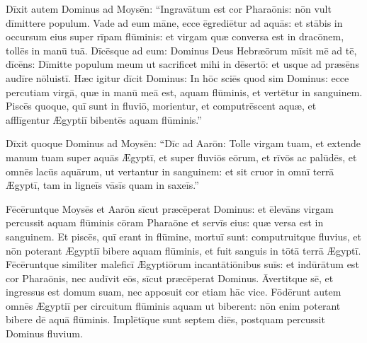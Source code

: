 Dīxit autem Dominus
ad Moysēn: ``Ingravātum est cor
Pharaōnis: nōn vult dīmittere populum. Vade ad eum
māne, ecce ēgrediētur ad aquās: et stābis in occursum eius super rīpam
flūminis: et virgam quæ conversa est in dracōnem, tollēs
in manū tuā. Dīcēsque ad eum: Dominus Deus Hebræōrum
mīsit mē ad tē, dīcēns: Dīmitte populum meum ut sacrificet
mihi in dēsertō: et usque ad præsēns audīre nōluistī. Hæc igitur dīcit
Dominus: In hōc sciēs quod sim Dominus: ecce percutiam virgā, quæ in manū
meā est, aquam flūminis, et vertētur in sanguinem.  Piscēs quoque, quī
sunt in fluviō, morientur, et computrēscent aquæ, et
afflīgentur Ægyptiī bibentēs aquam flūminis.''

Dīxit
quoque Dominus ad Moysēn: ``Dīc ad Aarōn: Tolle virgam
tuam, et extende manum tuam super aquās Ægyptī, et super fluviōs eōrum, et
rīvōs ac palūdēs, et omnēs lacūs aquārum, ut vertantur in
sanguinem: et sit cruor in omnī terrā Ægyptī, tam in ligneīs vāsīs quam in
saxeīs.''

Fēcēruntque Moysēs et Aarōn
sīcut præcēperat Dominus: et
ēlevāns virgam percussit aquam flūminis cōram
Pharaōne et servīs eius: quæ versa est in sanguinem.  Et
piscēs, quī erant in flūmine, mortuī sunt: computruitque
fluvius, et nōn poterant Ægyptiī bibere aquam flūminis, et fuit sanguis in
tōtā terrā Ægyptī.  Fēcēruntque similiter maleficī
Ægyptiōrum incantātiōnibus suīs: et indūrātum est cor Pharaōnis, nec audīvit eōs, sīcut
præcēperat Dominus.  Āvertitque sē, et
ingressus est domum suam, nec apposuit cor etiam hāc vice.
Fōdērunt autem omnēs Ægyptiī per circuitum flūminis
aquam ut biberent: nōn enim poterant bibere dē aquā flūminis. 
Implētīque sunt septem diēs, postquam percussit Dominus fluvium.
